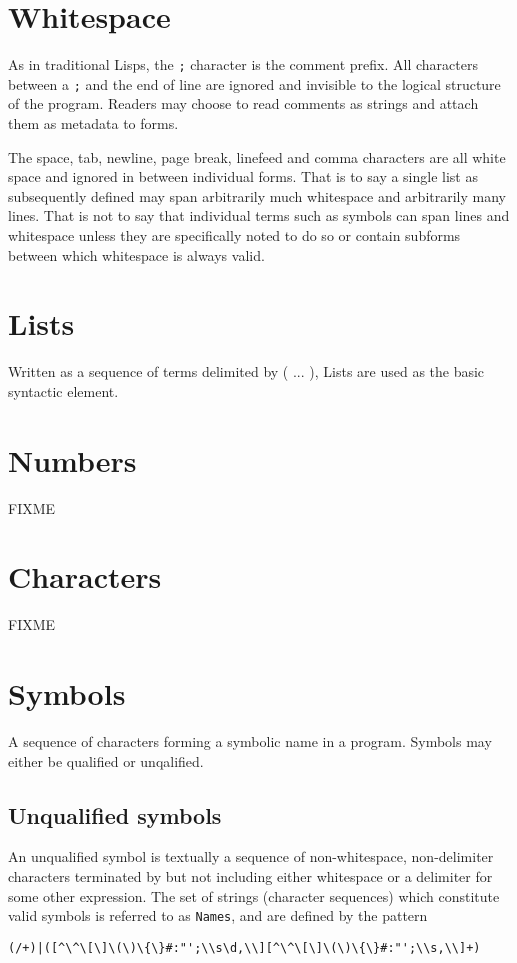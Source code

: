 \documentclass{report}
\begin{document}
\section{Whitespace}


As in traditional Lisps, the \verb|;| character is the comment prefix. All
characters between a \verb|;| and the end of line are ignored and invisible to
the logical structure of the program. Readers may choose to read comments as
strings and attach them as metadata to forms.

The space, tab, newline, page break, linefeed and comma characters are all white
space and ignored in between individual forms. That is to say a single list as
subsequently defined may span arbitrarily much whitespace and arbitrarily many
lines. That is not to say that individual terms such as symbols can span lines
and whitespace unless they are specifically noted to do so or contain subforms
between which whitespace is always valid.

\section{Lists}


Written as a sequence of terms delimited by ( ... ), Lists are used as the basic
syntactic element.

\section{Numbers}


FIXME

\section{Characters}


FIXME

\section{Symbols}


A sequence of characters forming a symbolic name in a program. Symbols may
either be qualified or unqalified.

\subsection{Unqualified symbols}
An unqualified symbol is textually a sequence of non-whitespace, non-delimiter
characters terminated by but not including either whitespace or a delimiter for
some other expression. The set of strings (character sequences) which constitute
valid symbols is referred to as \verb|Names|, and are defined by the pattern
\begin{verbatim}
(/+)|([^\^\[\]\(\)\{\}#:"';\\s\d,\\][^\^\[\]\(\)\{\}#:"';\\s,\\]+)
\end{verbatim}
\end{document}
